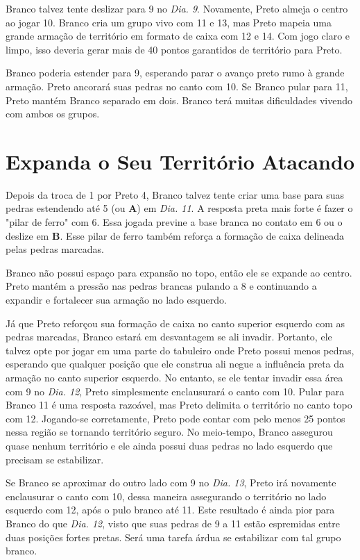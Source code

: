 Branco talvez tente deslizar  para 9 no \emph{Dia. 9}. Novamente, Preto almeja o centro ao jogar 10. Branco cria um grupo vivo com 11 e 13, mas Preto mapeia uma grande armação de território em formato de caixa com 12 e 14. Com jogo claro e limpo, isso deveria gerar mais de 40 pontos garantidos de território para Preto.

Branco poderia estender para 9, esperando parar o avanço preto rumo à grande armação. Preto ancorará suas pedras no canto com 10. Se Branco pular para 11, Preto mantém Branco separado em dois. Branco terá muitas dificuldades vivendo com ambos os grupos.

\section{Expanda o Seu Território Atacando}

Depois da troca de 1 por Preto 4, Branco talvez tente criar uma base para suas pedras estendendo até 5 (ou \textbf{A}) em \emph{Dia. 11}. A resposta preta mais forte é fazer o "pilar de ferro" com 6. Essa jogada previne a base branca no contato em 6 ou o deslize em \textbf{B}. Esse pilar de ferro também reforça a formação de caixa delineada pelas pedras marcadas.

Branco não possui espaço para expansão no topo, então ele se expande ao centro. Preto mantém a pressão nas pedras brancas pulando a 8 e continuando a expandir e fortalecer sua armação no lado esquerdo.

Já que Preto reforçou sua formação de caixa no canto superior esquerdo com as pedras marcadas, Branco estará em desvantagem se ali invadir. Portanto, ele talvez opte por jogar em uma parte do tabuleiro onde Preto possui menos pedras, esperando que qualquer posição que ele construa ali negue a influência preta da armação no canto superior esquerdo. No entanto, se ele tentar invadir essa área com 9 no \emph{Dia. 12}, Preto simplesmente enclausurará o canto com 10. Pular para Branco 11 é uma resposta razoável, mas Preto delimita o território no canto topo com 12. Jogando-se corretamente, Preto pode contar com pelo menos 25 pontos nessa região se tornando território seguro. No meio-tempo, Branco assegurou quase nenhum território e ele ainda possui duas pedras no lado esquerdo que precisam se estabilizar. 

Se Branco se aproximar do outro lado com 9 no \emph{Dia. 13}, Preto irá novamente enclausurar o canto com 10, dessa maneira assegurando o território no lado esquerdo com 12, após o pulo branco até 11. Este resultado é ainda pior para Branco do que \emph{Dia. 12}, visto que suas pedras de 9 a 11 estão espremidas  entre duas posições fortes pretas. Será uma tarefa árdua se estabilizar com tal grupo branco.

